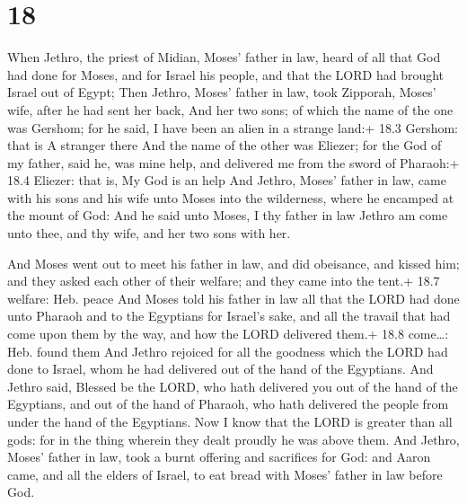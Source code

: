 \hypertarget{section-17}{%
\section{18}\label{section-17}}

 When Jethro, the priest of Midian, Moses' father in law,
heard of all that God had done for Moses, and for Israel his people, and
that the LORD had brought Israel out of Egypt;  Then Jethro,
Moses' father in law, took Zipporah, Moses' wife, after he had sent her
back,  And her two sons; of which the name of the one was
Gershom; for he said, I have been an alien in a strange land:+ 18.3
Gershom: that is A stranger there  And the name of the other
was Eliezer; for the God of my father, said he, was mine help, and
delivered me from the sword of Pharaoh:+ 18.4 Eliezer: that is, My God
is an help  And Jethro, Moses' father in law, came with his
sons and his wife unto Moses into the wilderness, where he encamped at
the mount of God:  And he said unto Moses, I thy father in
law Jethro am come unto thee, and thy wife, and her two sons with her.

 And Moses went out to meet his father in law, and did
obeisance, and kissed him; and they asked each other of their welfare;
and they came into the tent.+ 18.7 welfare: Heb. peace  And
Moses told his father in law all that the LORD had done unto Pharaoh and
to the Egyptians for Israel's sake, and all the travail that had come
upon them by the way, and how the LORD delivered them.+ 18.8 come\ldots:
Heb. found them  And Jethro rejoiced for all the goodness
which the LORD had done to Israel, whom he had delivered out of the hand
of the Egyptians.  And Jethro said, Blessed be the LORD,
who hath delivered you out of the hand of the Egyptians, and out of the
hand of Pharaoh, who hath delivered the people from under the hand of
the Egyptians.  Now I know that the LORD is greater than
all gods: for in the thing wherein they dealt proudly he was above them.
 And Jethro, Moses' father in law, took a burnt offering
and sacrifices for God: and Aaron came, and all the elders of Israel, to
eat bread with Moses' father in law before God.

